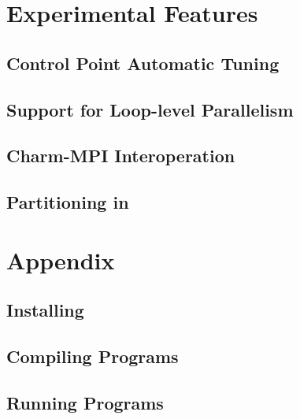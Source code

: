 \documentclass[10pt]{report}
\begin{document}
%


\part{Experimental Features}

\chapter{Control Point Automatic Tuning}
\label{sec:controlpoint}
  

\chapter{Support for Loop-level Parallelism}
\label{sec:ckloop}


\chapter{Charm-MPI Interoperation}
\label{sec:interop}
  

\chapter{Partitioning in \charmpp}
\label{sec:partition}
  

\part{Appendix}
\appendix

%

\chapter{Installing \charm}
\label{sec:install}
  

\chapter{Compiling \charm Programs}
\label{sec:compile}
  

\chapter{Running \charm Programs}
\label{sec:run}
  
\end{document}
